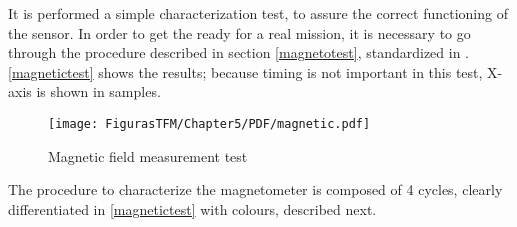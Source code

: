 It is performed a simple characterization test, to assure the correct functioning of the sensor. In order to get the  ready for a real mission, it is necessary to go through the procedure described in section \ref{magnetotest}, standardized in \cite{ESAmagnetic}. \autoref{magnetictest} shows the results; because timing is not important in this test, X-axis is shown in samples.


\begin{landscape}
\vspace*{\fill}
	\begin{figure} [H]
			\centering
			\texttt{[image: FigurasTFM/Chapter5/PDF/magnetic.pdf]}
			\caption{Magnetic field measurement test} 	\label{magnetictest}
\end{figure}
\vspace*{\fill}
\end{landscape}
\newpage

The procedure to characterize the magnetometer is composed of 4 cycles, clearly differentiated in \autoref{magnetictest} with colours, described next.

